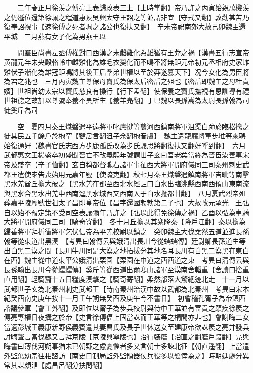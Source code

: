 　　二年春正月徐羨之傅亮上表歸政表三上【上時掌翻】帝乃許之丙寅始親萬機羨之仍遜位還第徐珮之程道惠及吳興太守王韶之等並謂非宜【守式又翻】敦勸甚苦乃復奉詔視事【速徐傅之死者珮之諸公也復扶又翻】　辛未帝祀南郊大赦己卯魏主還平城　二月燕有女子化為男燕王以

　　問羣臣尚書左丞傅權對曰西漢之末雌雞化為雄猶有王莽之禍【漢書五行志宣帝黄龍元年未央殿輅軨中雌雞化為雄毛衣變化而不鳴不將無距元帝初元丞相府史家雌雞伏子漸化為雄冠距鳴將其後王后羣弟世權以至於莽遂篡天下】况今女化為男臣將為君之兆也　三月丙寅魏主尊保母竇氏為保太后密后之殂也【密后即魏主之母杜貴嬪】世祖尚幼太宗以竇氏慈良有操行【行下孟翻】使保養之竇氏撫視有恩訓導有禮世祖德之故加以尊號奉養不異所生【養羊亮翻】丁巳魏以長孫嵩為太尉長孫翰為司徒奚斤為司

　　空　夏四月秦王熾磐遣平遠將軍叱盧犍等襲河西鎮南將軍沮渠白蹄於臨松擒之徙其民五千餘戶於枹罕【犍居言翻沮子余翻枹音膚】　魏主遣龍驤將軍步堆等來聘始復通好【魏書官氏志西方步鹿孤氏改為步氏驤思將翻復扶又翻好呼到翻】　六月武都惠文王楊盛卒初盛聞晉亡不改義熙年號謂世子玄曰吾老矣當終為晉臣汝善事宋帝及盛卒【辛子恤翻】玄自稱都督隴右諸軍事征西大將軍開府儀同三司秦州刺史武都王遣使來告喪始用元嘉年號【使疏吏翻】秋七月秦王熾磐遣鎮南將軍吉毗等南擊黑水羌酋丘擔大破之【黑水羌在鄧至西北水經註曰白水出臨洮縣西南西傾山東南流與黑水合黑水出羌中西南逕黑水城西又西南入于白水擔都甘翻】　八月夏武烈帝殂葬嘉平陵廟號世祖太子昌即皇帝位【昌字還國勃勃第二子也】大赦改元承光　王弘自以始不預定策不受司空表讓彌年乃許之【弘以此得免徐傳之禍】乙酉以弘為車騎大將軍開府儀同三司【騎奇寄翻】　冬十月丘擔以其衆降秦【降戶江翻】秦以擔為歸善將軍拜折衝將軍乞伏信帝為平羌校尉以鎮之　癸卯魏主大伐柔然五道並進長孫翰等從東道出黑漠　【考異曰翰傳云與娥清出長川今從蠕蠕傳】廷尉卿長孫道生等出白黑二漠之間【長川牛川同是大漠之地拓拔分其地名耳長川有白黑二漠黑在東白在西】魏主從中道東平公娥清出栗園【栗園在中道之西西道之東　考異曰清傳云與長孫翰出長川今從蠕蠕傳】奚斤等從西道出爾寒山諸軍至漠南舍輜重【舍讀曰捨重直用翻】輕騎齎十五日糧度漠擊之【騎奇寄翻】柔然部落大驚絶迹北走　十一月以武都世子玄為北秦州刺史武都王【時南秦州治漢中故以武都為北秦州　考異曰宋本紀癸酉南史庚午按十一月壬午朔無癸酉及庚午今不書日】　初會稽孔甯子為帝鎮西諮議參軍【會工外翻】及即位以甯子為步兵校尉與侍中王華並有富貴之願疾徐羨之傅亮專權日夜搆之於帝【史言徐傅偪上固當誅而王華等之構間亦非也】會謝晦二女當適彭城王義康新野侯義賓遣其妻曹氏及長子世休送女至建康帝欲誅羨之亮并發兵討晦聲言當伐魏又言拜京陵【京陵興寧陵也】治行裝艦【治直之翻艦戶黯翻】亮與晦書曰薄伐河朔事猶未已朝野之慮憂懼者多又言朝士多諫北征【朝直遥翻】上當遣外監萬幼宗往相諮訪【南史曰制局監外監領器仗兵役多以嬖倖為之】時朝廷處分異常其謀頗泄【處昌呂翻分扶問翻】

